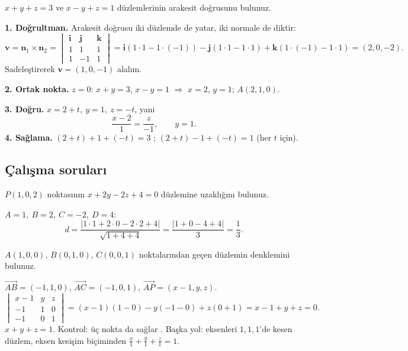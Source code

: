\begin{soru}
$x+y+z=3$ ve $x-y+z=1$ düzlemlerinin arakesit doğrusunu bulunuz.
\end{soru}
\begin{cevap}
\textbf{1. Doğrultman.} Arakesit doğrusu iki düzlemde de yatar, iki normale de diktir:
\[ \mathbf v=\mathbf n_1\times\mathbf n_2=\begin{vmatrix}\mathbf i&\mathbf j&\mathbf k\\1&1&1\\1&-1&1\end{vmatrix}
=\mathbf i(1\cdot1-1\cdot(-1))-\mathbf j(1\cdot1-1\cdot1)+\mathbf k(1\cdot(-1)-1\cdot1)=(2,0,-2). \]
Sadeleştirerek $\mathbf v=(1,0,-1)$ alalım.

\textbf{2. Ortak nokta.} $z=0$: $x+y=3$, $x-y=1$ $\Rightarrow$ $x=2$, $y=1$; $A(2,1,0)$.

\textbf{3. Doğru.} $x=2+t,\ y=1,\ z=-t$, yani
\[ \boxed{\frac{x-2}{1}=\frac{z}{-1},\qquad y=1}. \]
\textbf{4. Sağlama.} $(2+t)+1+(-t)=3$ \checkmark; $(2+t)-1+(-t)=1$ \checkmark (her $t$ için).
\end{cevap}

\subsection{Çalışma soruları}

\begin{soru}
$P(1,0,2)$ noktasının $x+2y-2z+4=0$ düzlemine uzaklığını bulunuz.
\end{soru}
\begin{cevap}
$A=1,\ B=2,\ C=-2,\ D=4$:
\[ d=\frac{|1\cdot1+2\cdot0-2\cdot2+4|}{\sqrt{1+4+4}}=\frac{|1+0-4+4|}{3}=\boxed{\frac13}. \]
\end{cevap}

\begin{soru}
$A(1,0,0)$, $B(0,1,0)$, $C(0,0,1)$ noktalarından geçen düzlemin denklemini bulunuz.
\end{soru}
\begin{cevap}
$\overrightarrow{AB}=(-1,1,0)$, $\overrightarrow{AC}=(-1,0,1)$, $\overrightarrow{AP}=(x-1,y,z)$.
\[ \begin{vmatrix}x-1&y&z\\-1&1&0\\-1&0&1\end{vmatrix}=(x-1)(1-0)-y(-1-0)+z(0+1)=x-1+y+z=0 . \]
$\boxed{x+y+z=1}$. Kontrol: üç nokta da sağlar \checkmark. Başka yol: eksenleri $1,1,1$'de kesen düzlem, eksen kesişim biçiminden $\frac x1+\frac y1+\frac z1=1$.
\end{cevap}

